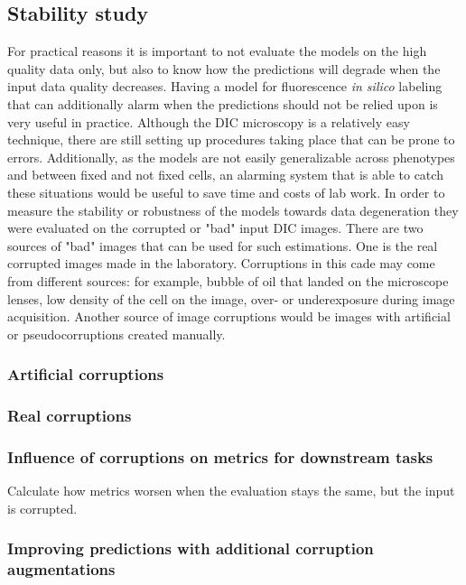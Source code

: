 \subsection{Stability study}
    For practical reasons it is important to not evaluate the models on the high quality data only, but also to know how the predictions will degrade when the input data quality decreases. Having a model for fluorescence \textit{in silico} labeling that can additionally alarm when the predictions should not be relied upon is very useful in practice. Although the DIC microscopy is a relatively easy technique, there are still setting up procedures taking place that can be prone to errors. Additionally, as the models are not easily generalizable across phenotypes and between fixed and not fixed cells, an alarming system that is able to catch these situations would be useful to save time and costs of lab work. In order to measure the stability or robustness of the models towards data degeneration they were evaluated on the corrupted or "bad" input DIC images. There are two sources of "bad" images that can be used for such estimations. One is the real corrupted images made in the laboratory. Corruptions in this cade may come from different sources: for example, bubble of oil that landed on the microscope lenses, low density of the cell on the image, over- or underexposure during image acquisition. Another source of image corruptions would be images with artificial or pseudocorruptions created manually. 
    
    \subsubsection{Artificial corruptions}
        
    \subsubsection{Real corruptions}
        
    \subsubsection{Influence of corruptions on metrics for downstream tasks}
        Calculate how metrics worsen when the evaluation stays the same, but the input is corrupted.
    \subsubsection{Improving predictions with additional corruption augmentations}
        \label{section:augments-againts-corruptions}
        